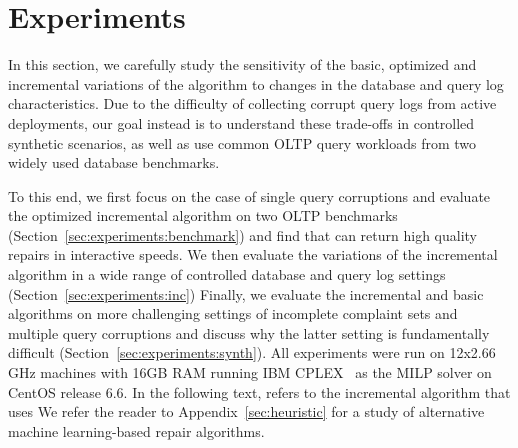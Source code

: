

\section{Experiments}
\label{sec:experiments}

In this section, we carefully study the sensitivity of the
basic, optimized and incremental variations of the \sys algorithm 
to changes in the database and query log characteristics.
Due to the difficulty of collecting corrupt query logs from active deployments, 
our goal instead is to understand these trade-offs in
controlled synthetic scenarios, as well as use common OLTP query workloads
from two widely used database benchmarks.

To this end, we first focus on the case of single query corruptions and evaluate
the optimized \sys incremental algorithm on two OLTP benchmarks (Section~\ref{sec:experiments:benchmark}) and find that \sys can return high quality repairs in interactive speeds.
We then evaluate the variations of the incremental algorithm in a wide range of controlled database and query log settings (Section~\ref{sec:experiments:inc})
Finally, we evaluate the incremental and basic algorithms on more challenging settings of incomplete complaint sets and multiple query corruptions and discuss why the latter setting is fundamentally difficult (Section~\ref{sec:experiments:synth}).
All experiments were run on 12x2.66 GHz  machines with 16GB RAM running IBM CPLEX~\cite{cplex2014v12} as the MILP solver on CentOS release 6.6.
In the following text, \sys refers to the incremental algorithm that uses 
We refer the reader to Appendix~\ref{sec:heuristic} for a study of alternative machine learning-based repair algorithms.

